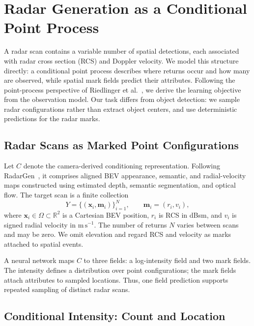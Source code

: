 \section{Radar Generation as a Conditional Point Process}
\label{sec:method}

A radar scan contains a variable number of spatial detections, each associated with radar cross section (RCS) and Doppler velocity.
We model this structure directly: a conditional point process describes where returns occur and how many are observed, while spatial mark fields predict their attributes.
Following the point-process perspective of Riedlinger et al.~\cite{riedlinger2026emptyspace}, we derive the learning objective from the observation model.
Our task differs from object detection: we sample radar configurations rather than extract object centers, and use deterministic predictions for the radar marks.

\subsection{Radar Scans as Marked Point Configurations}

Let $C$ denote the camera-derived conditioning representation.
Following RadarGen~\cite{borreda2026radargen}, it comprises aligned BEV appearance, semantic, and radial-velocity maps constructed using estimated depth, semantic segmentation, and optical flow.
The target scan is a finite collection
\begin{equation}
Y=\{(\mathbf{x}_i,\mathbf{m}_i)\}_{i=1}^{N},
\qquad \mathbf{m}_i=(r_i,v_i),
\end{equation}
where $\mathbf{x}_i\in\Omega\subset\mathbb{R}^2$ is a Cartesian BEV position, $r_i$ is RCS in dBsm, and $v_i$ is signed radial velocity in $\mathrm{m}\,\mathrm{s}^{-1}$.
The number of returns $N$ varies between scans and may be zero.
We omit elevation and regard RCS and velocity as marks attached to spatial events.

A neural network maps $C$ to three fields: a log-intensity field and two mark fields.
The intensity defines a distribution over point configurations; the mark fields attach attributes to sampled locations.
Thus, one field prediction supports repeated sampling of distinct radar scans.

\subsection{Conditional Intensity: Count and Location}

